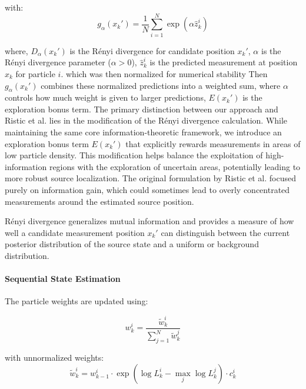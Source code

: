 \documentclass[../report.tex]{subfiles}
\begin{document}
    with:
    \begin{equation}
    g_\alpha(x_k') = \frac{1}{N}\sum_{i=1}^N \exp(\alpha \hat{z}_k^i)
    \end{equation}

    where, $D_\alpha(x_k')$ is the Rényi divergence for candidate position $x_k'$, $\alpha$ is the Rényi divergence parameter ($\alpha > 0$), $\hat{z}_k^i$ is the predicted measurement at position $x_k$ for particle $i$. which was then normalized for numerical stability Then $g_\alpha(x_k')$ combines these normalized predictions 
    into a weighted sum, where $\alpha$ controls how much weight is given to larger predictions, $E(x_k')$ is the exploration bonus term. The primary distinction between our approach and Ristic et al. 
    \cite{ristic2010information}
    lies in the modification of the Rényi divergence calculation. While maintaining the same core information-theoretic framework, we introduce an exploration bonus term $E(x_k')$ that explicitly 
    rewards measurements in areas of low particle density. This modification helps balance the exploitation of high-information regions with the exploration of uncertain areas, potentially leading 
    to more robust source localization. The original formulation by Ristic et al. focused purely on information gain, which could sometimes lead to overly concentrated measurements around the 
    estimated source position.

    Rényi divergence generalizes mutual information and provides a measure of how well a candidate measurement position $x_k'$ can distinguish between the current posterior distribution of the source state and a uniform or background distribution.

    \paragraph{Sequential State Estimation}
    The particle weights are updated using:

    \begin{equation}
    w_k^i = \frac{\tilde{w}_k^i}{\sum_{j=1}^N \tilde{w}_k^j}
    \end{equation}

    with unnormalized weights:
    \begin{equation}
    \tilde{w}_k^i = w_{k-1}^i \cdot \exp(\log L_k^i - \max_j \log L_k^j) \cdot c_k^i
    \end{equation}
\end{document}
